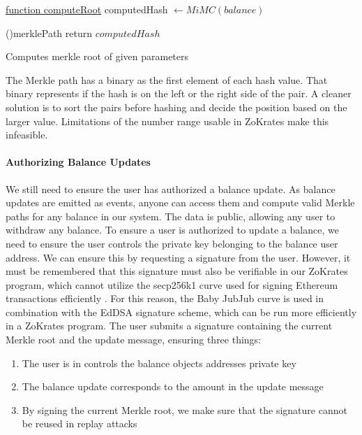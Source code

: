 \documentclass[../../thesis.tex]{subfiles}
\begin{document}
\begin{algorithm}

    \underline{function computeRoot}\;
    computedHash $\gets MiMC(balance)$

    \ForEach(){merklePath}
    {
    }
    return $computedHash$
    \caption{Computes merkle root of given parameters}
\end{algorithm}

The Merkle path has a binary as the first element of each hash value. That binary represents if the hash is on the left or the right side of the pair. A cleaner solution is to sort the pairs before hashing and decide the position based on the larger value. Limitations of the number range usable in ZoKrates make this infeasible.

\paragraph{Authorizing Balance Updates}
We still need to ensure the user has authorized a balance update. As balance updates are emitted as events, anyone can access them and compute valid Merkle paths for any balance in our system. The data is public, allowing any user to withdraw any balance. To ensure a user is authorized to update a balance, we need to ensure the user controls the private key belonging to the balance user address. We can ensure this by requesting a signature from the user. However, it must be remembered that this signature must also be verifiable in our ZoKrates program, which cannot utilize the secp256k1 curve used for signing Ethereum transactions efficiently \cite{deml_2019}. For this reason, the Baby JubJub \cite{baylinaeddsa} curve is used in combination with the EdDSA signature scheme, which can be run more efficiently in a ZoKrates program. The user submits a signature containing the current Merkle root and the update message, ensuring three things:

\begin{enumerate}
    \item The user is in controls the balance objects addresses private key
    \item The balance update corresponds to the amount in the update message
    \item By signing the current Merkle root, we make sure that the signature cannot be reused in replay attacks
\end{enumerate}
\end{document}
